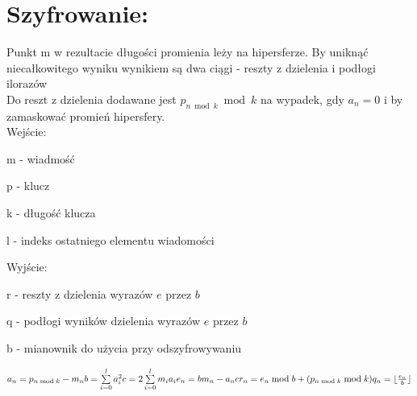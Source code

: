 \documentclass[11pt]{article}
\newcommand{\floor}[1]{\lfloor #1 \rfloor}
\begin{document}
	\section{Szyfrowanie:}
	Punkt m w rezultacie długości promienia leży na hipersferze.
	By uniknąć niecałkowitego wyniku wynikiem są dwa ciągi - reszty z dzielenia i podłogi ilorazów \\
	Do reszt z dzielenia dodawane jest \ensuremath{p_{n\bmod{k}}\bmod{k}} na wypadek, gdy \ensuremath{a_n = 0} i by zamaskować promień hipersfery. \\
	Wejście:
	\begin{description}
	\item m - wiadmość
	\item p - klucz
	\item k - długość klucza
	\item l - indeks ostatniego elementu wiadomości
	\end{description}
	Wyjście:
	\begin{description}
	\item r - reszty z dzielenia wyrazów \ensuremath{e} przez \ensuremath{b}
	\item q - podłogi wyników dzielenia wyrazów \ensuremath{e} przez \ensuremath{b}
	\item b - mianownik do użycia przy odszyfrowywaniu
	\end{description} 
	\ensuremath {
		a_n = p_{n \bmod{k}} - m_n \\
		b = \sum\limits_{i=0}^l a_i^2 \\
		c = 2\sum\limits_{i=0}^l m_ia_i \\
		e_n = bm_n - a_nc \\
		r_n = e_n\bmod{b} + (p_{n\bmod{k}}\bmod{k}) \\
		q_n = \floor{\frac{e_n}{b}}
	}
	\newpage
\end{document}
